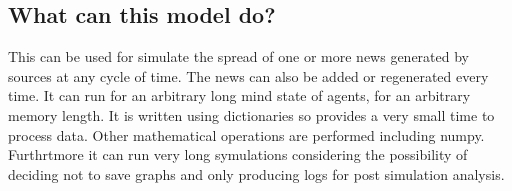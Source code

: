 \subsection{What can this model do?}
This can be used for simulate the spread of one or more news generated
by sources at any cycle of time. The news can also be added or regenerated
every time. It can run for an arbitrary long mind state of agents,
for an arbitrary memory length.
It is written using dictionaries so provides a very small time to process data.
Other mathematical operations are performed including numpy.
Furthrtmore it can run very long symulations considering the possibility
of deciding not to save graphs and only producing logs for post simulation
analysis.
